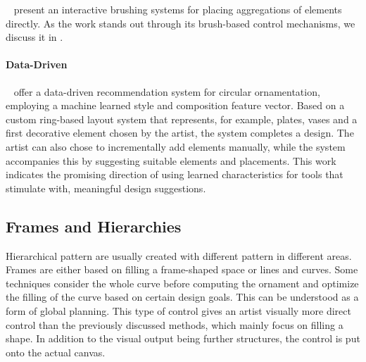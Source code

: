 \citeauthor*{hsu_2020_aef}~\cite{hsu_2020_aef} present an interactive brushing systems for placing aggregations of elements directly. As the work stands out through its brush-based control mechanisms, we discuss it in .


\paragraph*{Data-Driven}
\label{para:analysis_element_arrangements_datadriven}

\citeauthor*{phan_2016_ple}~\cite{phan_2016_ple} offer a data-driven recommendation system for circular ornamentation, employing a machine learned style and composition feature vector. Based on a custom ring-based layout system that represents, for example, plates, vases and a first decorative element chosen by the artist, the system completes a design. The artist can also chose to incrementally add elements manually, while the system accompanies this by suggesting suitable elements and placements. This work indicates the promising direction of using learned characteristics for tools that stimulate with, \eg meaningful design suggestions.


\subsection{Frames and Hierarchies}
\label{subsec:analysis_frames_and_hierarchies}

Hierarchical pattern are usually created with different pattern in different areas. Frames are either based on filling a frame-shaped space or lines and curves. Some techniques consider the whole curve before computing the ornament and optimize the filling of the curve based on certain design goals. This can be understood as a form of global planning. This type of control gives an artist visually more direct control than the previously discussed methods, which mainly focus on filling a shape. In addition to the visual output being further structures, the control is put onto the actual canvas.

